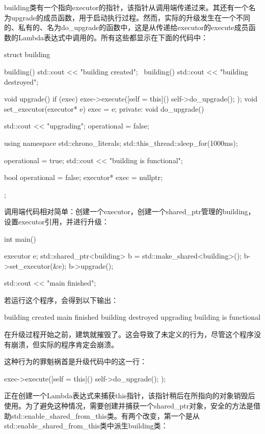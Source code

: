 building类有一个指向executor的指针，该指针从调用端传递过来。其还有一个名为upgrade的成员函数，用于启动执行过程。然而，实际的升级发生在一个不同的、私有的、名为do\_upgrade的函数中，这是从传递给executor的execute成员函数的Lambda表达式中调用的。所有这些都显示在下面的代码中：

\begin{cpp}
struct building
{
	building() { std::cout << "building created\n"; }
	~building() { std::cout << "building destroyed\n"; }
	
	void upgrade()
	{
		if (exec)
		{
			exec->execute([self = this]() {
				self->do_upgrade();
			});
		}
	}
	void set_executor(executor* e) { exec = e; }
private:
	void do_upgrade()
	{
		std::cout << "upgrading\n";
		operational = false;
		
		using namespace std::chrono_literals;
		std::this_thread::sleep_for(1000ms);
		
		operational = true;
		std::cout << "building is functional\n";
	}

	bool operational = false;
	executor* exec = nullptr;
};
\end{cpp}

调用端代码相对简单：创建一个executor，创建一个shared\_ptr管理的building，设置executor引用，并进行升级：

\begin{cpp}
int main()
{
	executor e;
	std::shared_ptr<building> b =
		std::make_shared<building>();
	b->set_executor(&e);
	b->upgrade();
	
	std::cout << "main finished\n";
}
\end{cpp}

若运行这个程序，会得到以下输出：

\begin{shell}
building created
main finished
building destroyed
upgrading
building is functional
\end{shell}

在升级过程开始之前，建筑就摧毁了。这会导致了未定义的行为，尽管这个程序没有崩溃，但实际的程序肯定会崩溃。

这种行为的罪魁祸首是升级代码中的这一行：

\begin{cpp}
exec->execute([self = this]() {
	self->do_upgrade();
});
\end{cpp}

正在创建一个Lambda表达式来捕获this指针，该指针稍后在所指向的对象销毁后使用。为了避免这种情况，需要创建并捕获一个shared\_ptr对象，安全的方法是借助std::enable\_shared\_from\_this类。有两个改变，第一个是从std::enable\_shared\_from\_this类中派生building类：

